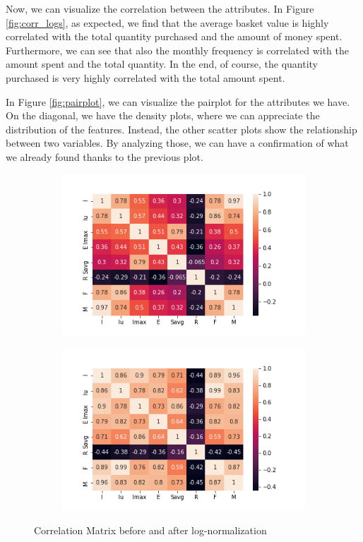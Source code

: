Now, we can visualize the correlation between the attributes. In Figure \ref{fig:corr_logs}, as expected, we find that the average basket value is highly correlated with the total quantity purchased and the amount of money spent. Furthermore, we can see that also the monthly frequency is correlated with the amount spent and the total quantity. In the end, of course, the quantity purchased is very highly correlated with the total amount spent.

In Figure \ref{fig:pairplot}, we can visualize the pairplot for the attributes we have.\\
On the diagonal, we have the density plots, where we can appreciate the distribution of the features. Instead, the other scatter plots show the relationship between two variables. By analyzing those, we can have a confirmation of what we already found thanks to the previous plot. 

\begin{figure}
\begin{subfigure}{.49\textwidth}
\centering
\includegraphics[width=.95\textwidth]{img/preparation/features_corr.png}
\caption{}
\label{fig:features_corr}
\end{subfigure}
\begin{subfigure}{.49\textwidth}
\centering
\captionsetup{justification=centering}
\includegraphics[width=.95\textwidth]{img/preparation/features_corr_logs.png}
\caption{}
\label{fig:features_corr_logs}
\end{subfigure}
\caption{Correlation Matrix before and after log-normalization}
\end{figure}

